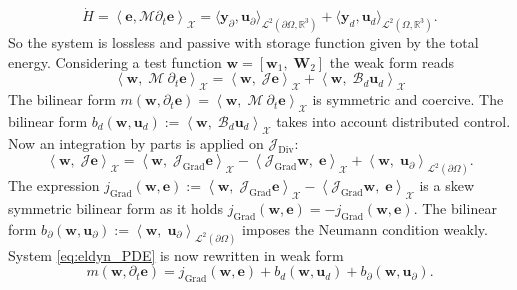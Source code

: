 \documentclass{svjour3}                     %
\DeclareMathOperator*{\Grad}{Grad}
\DeclareMathOperator*{\Div}{Div}
\begin{document}
\begin{equation}
\label{eq:pow_eldyn}
\dot{H} = \left\langle \bm{e},  \bm{\mathcal{M}} \partial_t \bm{e} \right\rangle_{\mathscr{X}} = \langle \bm{y}_\partial,  \bm{u}_\partial \rangle_{\mathscr{L}^2(\partial\Omega, \mathbb{R}^3)} + \langle \bm{y}_d,  \bm{u}_d \rangle_{\mathscr{L}^2(\Omega, \mathbb{R}^3)}.
\end{equation}
So the system is lossless and passive with storage function given by the total energy. Considering a test function $\bm{w} = [\bm{w}_1, \; \bm{W}_2]$ the weak form reads
\begin{equation*}
\left\langle \bm{w}, \; \bm{\mathcal{M}} \ \partial_t \bm{e} \right\rangle_{\mathscr{X}} = \left\langle \bm{w}, \; \bm{\mathcal{J}} \bm{e} \right\rangle_{\mathscr{X}} + \left\langle \bm{w}, \; \bm{\mathcal{B}}_d \bm{u}_d \right\rangle_{\mathscr{X}}
\end{equation*}
The bilinear form $m(\bm{w}, \partial_t \bm{e}) = \left\langle \bm{w}, \; \bm{\mathcal{M}} \ \partial_t \bm{e} \right\rangle_{\mathscr{X}}$ is symmetric and coercive. The bilinear form $b_d(\bm{w}, \bm{u}_d):=\left\langle \bm{w}, \; \bm{\mathcal{B}}_d \bm{u}_d \right\rangle_{\mathscr{X}}$ takes into account distributed control.\\
Now an integration by parts is applied on $\bm{\mathcal{J}}_{\Div}$:
\begin{equation}
\left\langle \bm{w}, \; \bm{\mathcal{J}} \bm{e} \right\rangle_{\mathscr{X}} = \left\langle \bm{w}, \; \bm{\mathcal{J}}_{\Grad} \bm{e} \right\rangle_{\mathscr{X}} - \left\langle \bm{\mathcal{J}}_{\Grad} \bm{w}, \; \bm{e} \right\rangle_{\mathscr{X}} + \left\langle \bm{w}, \; \bm{u}_\partial \right\rangle_{\mathscr{L}^2(\partial \Omega)}.
\end{equation}
The expression $j_{\Grad}(\bm{w}, \bm{e}) :=\left\langle \bm{w}, \; \bm{\mathcal{J}}_{\Grad} \bm{e} \right\rangle_{\mathscr{X}} - \left\langle \bm{\mathcal{J}}_{\Grad} \bm{w}, \; \bm{e} \right\rangle_{\mathscr{X}}$ is a skew symmetric bilinear form as it holds $j_{\Grad}(\bm{w}, \bm{e})=-j_{\Grad}(\bm{w}, \bm{e})$. The bilinear form $b_{\partial}(\bm{w}, \bm{u}_\partial) := \left\langle \bm{w}, \; \bm{u}_\partial \right\rangle_{\mathscr{L}^2(\partial \Omega)}$ imposes the Neumann condition weakly. System \eqref{eq:eldyn_PDE} is now rewritten in weak form
\begin{equation}
m(\bm{w}, \partial_t \bm{e}) = j_{\Grad}(\bm{w}, \bm{e}) + b_d(\bm{w}, \bm{u}_d) + b_{\partial}(\bm{w}, \bm{u}_\partial).
\end{equation}
\end{document}
